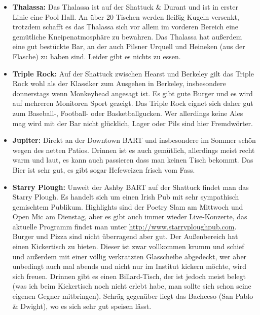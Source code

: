 \documentclass[a4paper]{scrreprt}
\begin{document}
\begin{itemize}

  \item \textbf{Thalassa:} Das Thalassa ist auf der Shattuck \& Durant und ist in erster Linie eine Pool Hall. An über 20 Tischen werden fleißig Kugeln versenkt, trotzdem schafft es das Thalassa sich vor allem im vorderen Bereich eine gemütliche Kneipenatmosphäre zu bewahren. Das Thalassa hat außerdem eine gut bestückte Bar, an der auch Pilsner Urquell und Heineken (aus der Flasche) zu haben sind. Leider gibt es nichts zu essen.

  \item \textbf{Triple Rock:} Auf der Shattuck zwischen Hearst und Berkeley gilt das Triple Rock wohl als der Klassiker zum Ausgehen in Berkeley, insbesondere donnerstags wenn Monkeyhead angesagt ist. Es gibt gute Burger und es wird auf mehreren Monitoren Sport gezeigt. Das Triple Rock eignet sich daher gut zum Baseball-, Football- oder Basketballgucken. Wer allerdings keine Ales mag wird mit der Bar nicht glücklich, Lager oder Pils sind hier Fremdwörter.
  
  \item \textbf{Jupiter:} Direkt an der Downtown BART und insbesondere im Sommer schön wegen des netten Patios. Drinnen ist es auch gemütlich, allerdings meist recht warm und laut, es kann auch passieren dass man keinen Tisch bekommt. Das Bier ist sehr gut, es gibt sogar Hefeweizen frisch vom Fass.
  
  
  \item \textbf{Starry Plough:} Unweit der Ashby BART auf der Shattuck findet man das Starry Plough. Es handelt sich um einen Irish Pub mit sehr sympathisch gemischtem Publikum. Highlights sind der Poetry Slam am Mittwoch und Open Mic am Dienstag, aber es gibt auch immer wieder Live-Konzerte, das aktuelle Programm findet man unter \url{http://www.starryploughpub.com}. Burger und Pizza sind nicht überragend aber gut. Der Außenbereich hat einen Kickertisch zu bieten. Dieser ist zwar vollkommen krumm und schief und außerdem mit einer völlig verkratzten Glasscheibe abgedeckt, wer aber unbedingt auch mal abends und nicht nur im Institut kickern möchte, wird sich freuen. Drinnen gibt es einen Billard-Tisch, der ist jedoch meist belegt (was ich beim Kickertisch noch nicht erlebt habe, man sollte sich schon seine eigenen Gegner mitbringen). Schräg gegenüber liegt das Bacheeso (San Pablo \& Dwight), wo es sich sehr gut speisen lässt.
  

\end{itemize}
\end{document}
